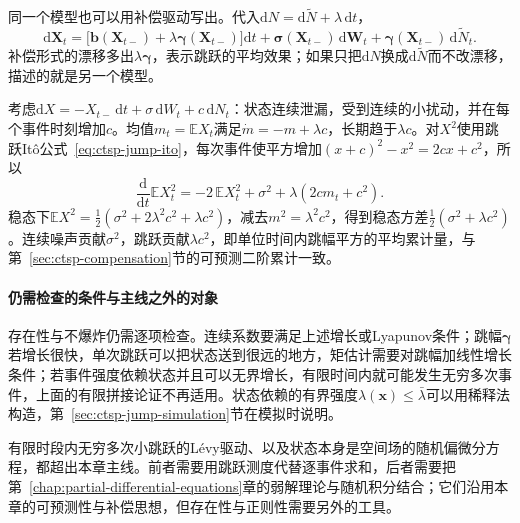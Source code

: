 同一个模型也可以用补偿驱动写出。代入$\mathrm dN=\mathrm d\widetilde N+\lambda\,\mathrm dt$，
\[
  \mathrm d\bm X_t=\bigl[\bm b(\bm X_{t-})+\lambda\bm\gamma(\bm X_{t-})\bigr]\mathrm dt+\bm\sigma(\bm X_{t-})\,\mathrm d\bm W_t+\bm\gamma(\bm X_{t-})\,\mathrm d\widetilde N_t .
\]
补偿形式的漂移多出$\lambda\bm\gamma$，表示跳跃的平均效果；如果只把$\mathrm dN$换成$\mathrm d\widetilde N$而不改漂移，描述的就是另一个模型。

\begin{example}[散粒噪声]
  \label{ex:ctsp-shot-noise}
  考虑$\mathrm dX=-X_{t-}\,\mathrm dt+\sigma\,\mathrm dW_t+c\,\mathrm dN_t$：状态连续泄漏，受到连续的小扰动，并在每个事件时刻增加$c$。均值$m_t=\mathbb EX_t$满足$\dot m=-m+\lambda c$，长期趋于$\lambda c$。对$X^2$使用跳跃Itô公式~\eqref{eq:ctsp-jump-ito}，每次事件使平方增加$(x+c)^2-x^2=2cx+c^2$，所以
  \[
    \frac{\mathrm d}{\mathrm dt}\mathbb EX_t^2=-2\,\mathbb EX_t^2+\sigma^2+\lambda(2cm_t+c^2).
  \]
  稳态下$\mathbb EX^2=\frac12(\sigma^2+2\lambda^2c^2+\lambda c^2)$，减去$m^2=\lambda^2c^2$，得到稳态方差$\frac12(\sigma^2+\lambda c^2)$。连续噪声贡献$\sigma^2$，跳跃贡献$\lambda c^2$，即单位时间内跳幅平方的平均累计量，与第~\ref{sec:ctsp-compensation}节的可预测二阶累计一致。
\end{example}

\paragraph{仍需检查的条件与主线之外的对象}
存在性与不爆炸仍需逐项检查。连续系数要满足上述增长或Lyapunov条件；跳幅$\bm\gamma$若增长很快，单次跳跃可以把状态送到很远的地方，矩估计需要对跳幅加线性增长条件；若事件强度依赖状态并且可以无界增长，有限时间内就可能发生无穷多次事件，上面的有限拼接论证不再适用。状态依赖的有界强度$\lambda(\bm x)\leq\bar\lambda$可以用稀释法构造，第~\ref{sec:ctsp-jump-simulation}节在模拟时说明。

有限时段内无穷多次小跳跃的Lévy驱动、以及状态本身是空间场的随机偏微分方程，都超出本章主线。前者需要用跳跃测度代替逐事件求和，后者需要把第~\ref{chap:partial-differential-equations}章的弱解理论与随机积分结合；它们沿用本章的可预测性与补偿思想，但存在性与正则性需要另外的工具。

